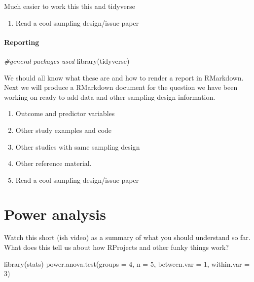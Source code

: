 \documentclass[
]{book}
\newenvironment{Shaded}{\begin{snugshade}}{\end{snugshade}}
\newcommand{\AttributeTok}[1]{\textcolor[rgb]{0.77,0.63,0.00}{#1}}
\newcommand{\CommentTok}[1]{\textcolor[rgb]{0.56,0.35,0.01}{\textit{#1}}}
\newcommand{\DecValTok}[1]{\textcolor[rgb]{0.00,0.00,0.81}{#1}}
\newcommand{\FunctionTok}[1]{\textcolor[rgb]{0.00,0.00,0.00}{#1}}
\newcommand{\NormalTok}[1]{#1}
\providecommand{\tightlist}{%
  \setlength{\itemsep}{0pt}\setlength{\parskip}{0pt}}
\begin{document}
Much easier to work this this and tidyverse

\begin{enumerate}
\def\labelenumi{\arabic{enumi}.}
\setcounter{enumi}{6}
\tightlist
\item
  Read a cool sampling design/issue paper
\end{enumerate}

\hypertarget{reporting}{%
\subsubsection{Reporting}\label{reporting}}

\begin{Shaded}
\begin{Highlighting}[]
\CommentTok{\#general packages used}
\FunctionTok{library}\NormalTok{(tidyverse)}
\end{Highlighting}
\end{Shaded}

We should all know what these are and how to render a report in RMarkdown. Next we will produce a RMarkdown document for the question we have been working on ready to add data and other sampling design information.

\begin{enumerate}
\def\labelenumi{\arabic{enumi}.}
\tightlist
\item
  Outcome and predictor variables
\item
  Other study examples and code
\item
  Other studies with same sampling design
\item
  Other reference material.
\item
  Read a cool sampling design/issue paper
\end{enumerate}

\hypertarget{power-analysis}{%
\chapter{Power analysis}\label{power-analysis}}

Watch this short (ish video) as a summary of what you should understand so far.
What does this tell us about how RProjects and other funky things work?

\begin{Shaded}
\begin{Highlighting}[]
\FunctionTok{library}\NormalTok{(stats)}
\FunctionTok{power.anova.test}\NormalTok{(}\AttributeTok{groups =} \DecValTok{4}\NormalTok{, }\AttributeTok{n =} \DecValTok{5}\NormalTok{, }\AttributeTok{between.var =} \DecValTok{1}\NormalTok{, }\AttributeTok{within.var =} \DecValTok{3}\NormalTok{)}
\end{Highlighting}
\end{Shaded}
\end{document}
